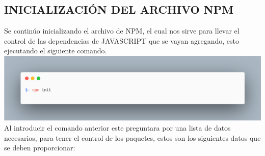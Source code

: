 \subsection{INICIALIZACIÓN DEL ARCHIVO NPM}
Se continúo inicializando el archivo de NPM, el cual nos sirve para llevar el control de las dependencias de JAVASCRIPT que se vayan agregando, esto ejecutando el siguiente comando.
\newline
\newline
\includegraphics[width=1\textwidth]{./Imagenes/image11.png}
\newline
\newline
Al introducir el comando anterior este preguntara por una lista de datos necesarios, para tener el control de los paquetes, estos son los siguientes datos que se deben proporcionar:

